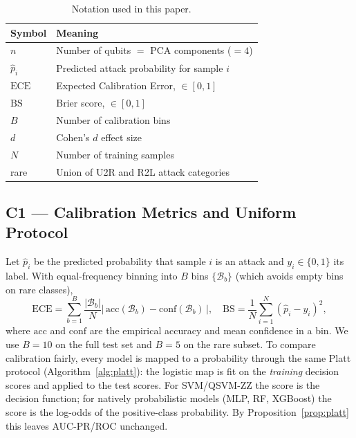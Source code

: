 \documentclass[journal]{IEEEtran}
\newcommand{\ZZ}{\textsc{ZZ}}
\newcommand{\QSVM}{QSVM-\ZZ}
\newcommand{\ECE}{\mathrm{ECE}}
\newcommand{\Brier}{\mathrm{BS}}
\begin{document}
\begin{table}[t]
\centering
\caption{Notation used in this paper.}
\label{tab:notation}
\small
\begin{tabular}{ll}
\toprule
Symbol & Meaning\\\midrule
$n$ & Number of qubits $=$ PCA components ($=4$)\\
$\hat{p}_i$ & Predicted attack probability for sample $i$\\
$\ECE$ & Expected Calibration Error, $\in[0,1]$\\
$\Brier$ & Brier score, $\in[0,1]$\\
$B$ & Number of calibration bins\\
$d$ & Cohen's $d$ effect size\\
$N$ & Number of training samples\\
rare & Union of U2R and R2L attack categories\\
\bottomrule
\end{tabular}
\end{table}

\subsection{C1 --- Calibration Metrics and Uniform Protocol}
Let $\hat{p}_i$ be the predicted probability that sample $i$ is an attack
and $y_i\in\{0,1\}$ its label. With equal-frequency binning into $B$ bins
$\{\mathcal{B}_b\}$ (which avoids empty bins on rare classes),
\begin{equation}
\ECE=\sum_{b=1}^{B}\frac{|\mathcal{B}_b|}{N}
     \big|\,\mathrm{acc}(\mathcal{B}_b)-\mathrm{conf}(\mathcal{B}_b)\,\big|,
\quad
\Brier=\frac{1}{N}\sum_{i=1}^{N}(\hat{p}_i-y_i)^2,
\end{equation}
where $\mathrm{acc}$ and $\mathrm{conf}$ are the empirical accuracy and
mean confidence in a bin. We use $B{=}10$ on the full test set and
$B{=}5$ on the rare subset. To compare calibration fairly, every model is
mapped to a probability through the same Platt protocol
(Algorithm~\ref{alg:platt}): the logistic map is fit on the
\emph{training} decision scores and applied to the test scores. For
SVM/\QSVM{} the score is the decision function; for natively
probabilistic models (MLP, RF, XGBoost) the score is the log-odds of the
positive-class probability. By Proposition~\ref{prop:platt} this leaves
AUC-PR/ROC unchanged.
\end{document}
